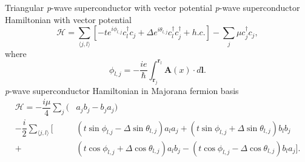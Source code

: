 \documentclass[xcolor=dvipsnames,10pt,aspectratio=169]{beamer}
\renewcommand{\vec}[1]{\mathbf{#1}}
\newcommand{\ham}{\mathcal{H}}
\newcommand{\cc}{c^{\dagger}}
\newcommand{\de}{\Delta}
\begin{document}
  \begin{frame}{Triangular \textit{p}-wave superconductor with vector potential}
    \textit{p}-wave superconductor Hamiltonian with vector potential
    \begin{equation}
      \ham = \sum_{\langle j,l \rangle} \left[ -t e^{i\phi_{l,j}}\cc_{l} c_j + \de e^{i\theta_{l,j}} \cc_{l}\cc_j + h.c.\right] - \sum_j \mu \cc_j c_j,
    \end{equation}
    where
    \begin{equation}
      \phi_{l,j} = -\dfrac{ie}{\hbar} \int_{\vec{r}_j}^{\vec{r}_l} \vec{A}(x) \cdot d\vec{l}.
    \end{equation}
    \textit{p}-wave superconductor Hamiltonian in Majorana fermion basis
    \begin{align}
      \ham = -\dfrac{i\mu}{4} \sum_j (& a_j b_j - b_j a_j) \nonumber \\
      -\dfrac{i}{2} \sum_{\langle j,l\rangle} [&(t\sin\phi_{l.j}-\de\sin\theta_{l,j}) a_l a_j
      +(t\sin\phi_{l,j}+\de\sin\theta_{l,j}) b_l b_j \nonumber \\
      +&(t\cos\phi_{l,j}+\de\cos\theta_{l,j}) a_l b_j
      -(t\cos\phi_{l,j}-\de\cos\theta_{l,j}) b_l a_j].
    \end{align}

  \end{frame}
\end{document}
